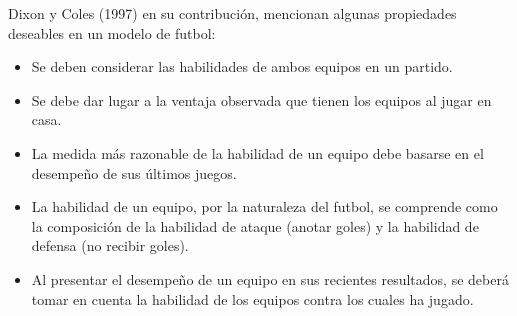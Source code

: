 Dixon y Coles (1997) \cite{dixon1997modelling} en su contribución, mencionan algunas propiedades deseables en un modelo de futbol:
\begin{itemize}
	\item Se deben considerar las habilidades de ambos equipos en un partido.
	\item Se debe dar lugar a la ventaja observada que tienen los equipos al jugar en casa.
	\item La medida más razonable de la habilidad de un equipo debe basarse en el desempeño de sus últimos juegos.
	\item La habilidad de un equipo, por la naturaleza del futbol, se comprende como la composición de la habilidad de ataque (anotar goles) y la habilidad de defensa (no recibir goles).
	\item Al presentar el desempeño de un equipo en sus recientes resultados, se deberá tomar en cuenta la habilidad de los equipos contra los cuales ha jugado.
\end{itemize}



